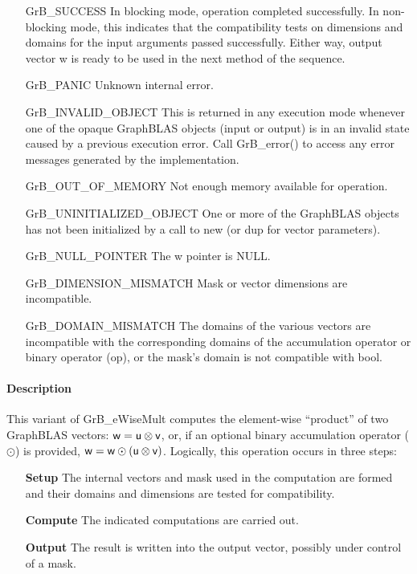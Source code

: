 \begin{itemize}[leftmargin=2.1in]
    \item[{\sf GrB\_SUCCESS}]         In blocking mode, operation
	completed successfully. In non-blocking mode, this indicates
	that the compatibility tests on dimensions and domains for the
	input arguments passed successfully. Either way, output vector
	{\sf w} is ready to be used in the next method of the sequence.

    \item[{\sf GrB\_PANIC}]           Unknown internal error.
    
    \item[{\sf GrB\_INVALID\_OBJECT}] This is returned in any execution mode 
    whenever one of the opaque GraphBLAS objects (input or output) is in an invalid 
    state caused by a previous execution error.  Call {GrB\_error()} to access 
    any error messages generated by the implementation.

    \item[{\sf GrB\_OUT\_OF\_MEMORY}] Not enough memory available for operation.
    
    \item[{\sf GrB\_UNINITIALIZED\_OBJECT}] One or more of the GraphBLAS objects 
    has not been initialized by a call to {\sf new} (or {\sf dup} for vector
    parameters).
    
    \item[{\sf GrB\_NULL\_POINTER}]  The {\sf w} pointer is {\sf NULL}.

    \item[{\sf GrB\_DIMENSION\_MISMATCH}] Mask or vector dimensions are incompatible.

	\item[{\sf GrB\_DOMAIN\_MISMATCH}]    The domains of the various
	vectors are incompatible with the corresponding domains of the
	accumulation operator or binary operator ({\sf op}), or the mask's domain 
    is not compatible with bool.
\end{itemize}

\paragraph{Description}

This variant of {\sf GrB\_eWiseMult} computes the element-wise ``product'' of
two GraphBLAS vectors: ${\sf w} = {\sf u} \otimes {\sf v}$, or, if an optional
binary accumulation operator ($\odot$) is provided, ${\sf w} = {\sf w} \odot
\left({\sf u} \otimes {\sf v}\right)$.  Logically, this operation occurs in
three steps:
\begin{enumerate}[leftmargin=0.75in]
\item[\bf Setup] The internal vectors and mask used in the computation are formed 
and their domains and dimensions are tested for compatibility.
\item[\bf Compute] The indicated computations are carried out.
\item[\bf Output] The result is written into the output vector, possibly under 
control of a mask.
\end{enumerate}

